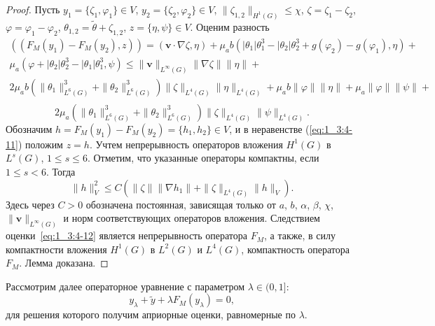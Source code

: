 \begin{proof}
    Пусть $y_1=\{\zeta_1, \varphi_1\}
    \in V$, $y_2=\{\zeta_2, \varphi_2\} \in V$,
    $\|\zeta_{1,2}\|_{H^1(G)} \leq \chi$, $\zeta = \zeta_1 - \zeta_2$,
    $\varphi = \varphi_1 - \varphi_2$, $\theta_{1,2} =
    \widetilde{\theta} + \zeta_{1,2}$, $z = \{\eta, \psi\} \in V$.
    Оценим разность
    \begin{gather*}
        ((F_M(y_1)-F_M(y_2), z)) = (\textbf{v}\cdot\nabla\zeta, \eta) +
        \mu_a
        b(|\theta_1|\theta_1^3-|\theta_2|\theta_2^3
        +g(\varphi_2)-g(\varphi_1), \eta)+\\
        \mu_a(\varphi+|\theta_2|\theta_2^3-|\theta_1|\theta_1^3, \psi)
        \leq \|\textbf{v}\|_{L^{\infty}(G)} \|\nabla\zeta\| \|\eta\| +\\
        2\mu_a b\left(\|\theta_1\|^3_{L^6(G)} +
        \|\theta_2\|^3_{L^6(G)}\right) \|\zeta\|_{L^4(G)}
        \|\eta\|_{L^4(G)} + \mu_a
        b\|\varphi\|\|\eta\|+\mu_a\|\varphi\|\|\psi\|+\\
    \end{gather*}
    \begin{equation}
        \label{eq:1_3:4-11}
        2\mu_a
        \left(\|\theta_1\|^3_{L^6(G)}
        + \|\theta_2\|^3_{L^6(G)}\right)\|\zeta\|_{L^4(G)}\|\psi\|_{L^4(G)}.
    \end{equation}
    Обозначим $h=F_M(y_1)-F_M(y_2)=\{h_1, h_2\} \in V$, и в
    неравенстве (\ref{eq:1_3:4-11}) положим $z=h$.
    Учтем непрерывность
    операторов вложения $H^1(G)$ в $L^s(G)$, $1 \leq s \leq 6$.
    Отметим, что указанные операторы компактны, если $1 \leq s < 6$.
    Тогда
    \begin{equation}
        \label{eq:1_3:4-12}
        \|h\|^2_V \leq C \left( \|\zeta\|\|\nabla h_1\| +
        \|\zeta\|_{L^4(G)}\|h\|_V\right).
    \end{equation}
    Здесь через $C>0$ обозначена постоянная, зависящая только от $a$,
    $b$, $\alpha$, $\beta$, $\chi$, $\|\textbf{v}\|_{L^{\infty}(G)}$ и
    норм соответствующих операторов вложения.
    Следствием оценки~\eqref{eq:1_3:4-12} является
    непрерывность оператора $F_M$, а также, в
    силу компактности вложения $H^1(G)$ в $L^2(G)$ и $L^4(G)$,
    компактность оператора $F_M$.
    Лемма доказана.
\end{proof}

Рассмотрим далее операторное уравнение с параметром
$\lambda \in (0,1]$:
\begin{equation}
    \label{eq:1_3:4-13}
    y_{\lambda} + \widetilde{y} + \lambda F_M(y_{\lambda}) = 0,
\end{equation}
для решения которого получим априорные оценки, равномерные по $\lambda$.

